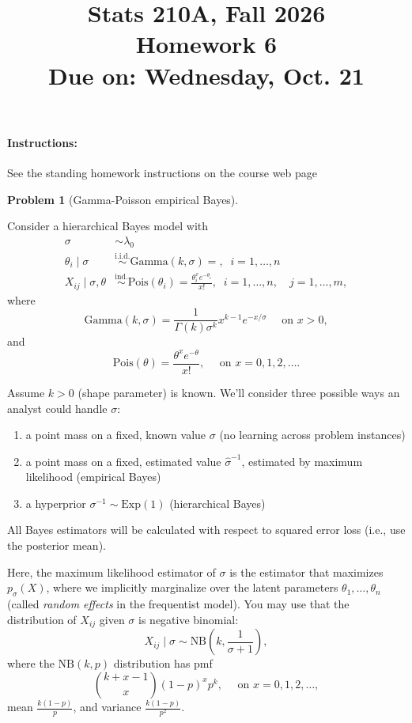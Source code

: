 \documentclass{article}
\newcommand{\simiid}{\overset{\text{i.i.d.}}{\sim}}
\newcommand{\simind}{\overset{\text{ind.}}{\sim}}
\theoremstyle{definition}
\newtheorem{problem}{Problem}
\begin{document}
\title{Stats 210A, Fall 2026\\
  Homework 6 \\
  {\large {\bf Due on}: Wednesday, Oct. 21}}
\date{}

\maketitle

\paragraph{Instructions:} See the standing homework instructions on the course web page



\begin{problem}[Gamma-Poisson empirical Bayes]
\label{prob:gamma-poisson-bayes}

Consider a hierarchical Bayes model with 
\begin{align*}
  \sigma &\sim \lambda_0\\
  \theta_i \mid \sigma &\simiid \text{Gamma}(k,\sigma) = , \;\; i=1,\ldots,n\\
  X_{ij} \mid \sigma, \theta &\simind \text{Pois}(\theta_i) = \frac{\theta_i^{x}e^{-\theta_i}}{x!}, \;\; i=1,\ldots,n, \quad j = 1,\ldots,m,
\end{align*}
where
\[
\text{Gamma}(k,\sigma) = \frac{1}{\Gamma(k)\sigma^{k}} x^{k - 1}e^{-x/\sigma} \quad \text{ on } x>0,
\]
and
\[
\text{Pois}(\theta) = \frac{\theta^{x}e^{-\theta}}{x!}, \quad \text{ on } x=0,1,2,\ldots.
\]

Assume $k > 0$ (shape parameter) is known. We'll consider three possible ways an analyst could handle $\sigma$:
\begin{enumerate}[leftmargin=.5in, label=(\roman*),]
\item a point mass on a fixed, known value $\sigma$ (no learning across problem instances)
\item a point mass on a fixed, estimated value $\hat\sigma^{-1}$, estimated by maximum likelihood (empirical Bayes)
\item a hyperprior $\sigma^{-1} \sim \text{Exp}(1)$ (hierarchical Bayes)
\end{enumerate}
All Bayes estimators will be calculated with respect to squared error loss (i.e., use the posterior mean).

Here, the maximum likelihood estimator of $\sigma$ is the estimator that maximizes $p_\sigma(X)$, where we implicitly marginalize over the latent parameters $\theta_1,\ldots,\theta_n$ (called {\em random effects} in the frequentist model). You may use that the distribution of $X_{ij}$ given $\sigma$ is negative binomial:
\[
X_{ij} \mid \sigma \sim \text{NB}\left(k,\frac{1}{\sigma + 1}\right),
\]
where the $\text{NB}(k,p)$ distribution has pmf
\[
\binom{k+x-1}{x}(1-p)^xp^k, \quad \text{ on } x=0,1,2,\ldots,
\]
mean $\frac{k(1-p)}{p}$, and variance $\frac{k(1-p)}{p^2}$. 


\end{problem}
\end{document}
